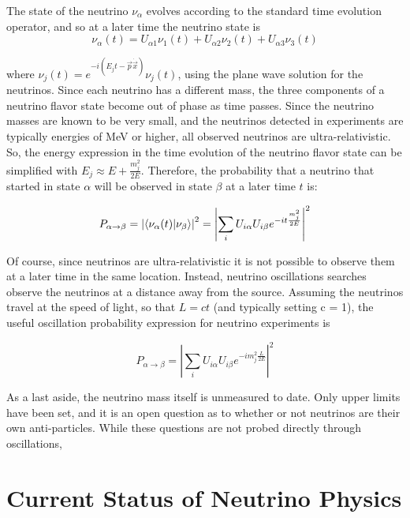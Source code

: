 The state of the neutrino $\nu_\alpha$ evolves according to the standard time evolution operator, and so at a later time the neutrino state is  
\begin{equation*}
\nu_\alpha (t) = U_{\alpha 1} \nu_1(t) + U_{\alpha 2} \nu_2(t) + U_{\alpha 3} \nu_3(t)
\end{equation*}

where $\nu_{j}(t) = e^{-i ( E_j t - \vec{p} \dot \vec{x})} \nu_j (t)$, using the plane wave solution for the neutrinos.  Since each neutrino has a different mass, the three components of a neutrino flavor state become out of phase as time passes.  Since the neutrino masses are known to be very small, and the neutrinos detected in experiments are typically energies of MeV or higher, all observed neutrinos are ultra-relativistic.  So, the energy expression in the time evolution of the neutrino flavor state can be simplified with $E_j \approx E + \frac{m_j^2}{2E}$.  Therefore, the probability that a neutrino that started in state $\alpha$ will be observed in state $\beta$ at a later time $t$ is:

\begin{equation*}
P_{\alpha\rightarrow\beta} = \left|\braket{\nu_\alpha(t) | \nu_\beta}\right|^2 = \left|\sum_i U_{i\alpha} U_{i\beta} e^{-i t \frac{m_j^2 }{ 2 E}}\right|^2
\end{equation*}

Of course, since neutrinos are ultra-relativistic it is not possible to observe them at a later time in the same location.  Instead, neutrino oscillations searches observe the neutrinos at a distance away from the source.  Assuming the neutrinos travel at the speed of light, so that $L = c t$ (and typically setting c = 1), the useful oscillation probability expression for neutrino experiments is 

\begin{equation*}
P_{\alpha\rightarrow\beta} = \left|\sum_i U_{i\alpha} U_{i\beta} e^{-i m_j^2 \frac{L}{2E}}\right|^2
\end{equation*}



As a last aside, the neutrino mass itself is unmeasured to date.  Only upper limits have been set, and it is an open question as to whether or not neutrinos are their own anti-particles.  While these questions are not probed directly through oscillations, 

\section{Current Status of Neutrino Physics}

